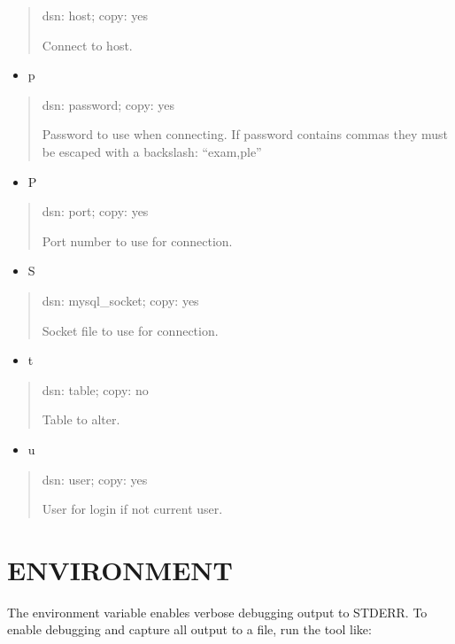 \documentclass[letterpaper,10pt,english]{sphinxmanual}
\begin{document}
\begin{quote}

dsn: host; copy: yes

Connect to host.
\end{quote}
\begin{itemize}
\item {} 
p

\end{itemize}
\begin{quote}

dsn: password; copy: yes

Password to use when connecting.
If password contains commas they must be escaped with a backslash: “exam,ple”
\end{quote}
\begin{itemize}
\item {} 
P

\end{itemize}
\begin{quote}

dsn: port; copy: yes

Port number to use for connection.
\end{quote}
\begin{itemize}
\item {} 
S

\end{itemize}
\begin{quote}

dsn: mysql\_socket; copy: yes

Socket file to use for connection.
\end{quote}
\begin{itemize}
\item {} 
t

\end{itemize}
\begin{quote}

dsn: table; copy: no

Table to alter.
\end{quote}
\begin{itemize}
\item {} 
u

\end{itemize}
\begin{quote}

dsn: user; copy: yes

User for login if not current user.
\end{quote}


\section{ENVIRONMENT}
\label{\detokenize{mariadb-schema-change:environment}}
The environment variable  enables verbose debugging output to STDERR.
To enable debugging and capture all output to a file, run the tool like:
\end{document}
